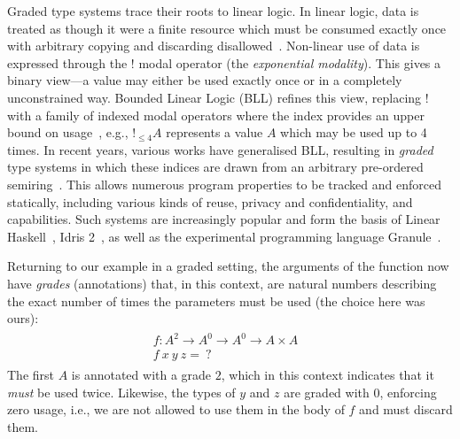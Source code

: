 Graded type systems trace their roots to linear logic. In linear logic, data is
treated as though it were a finite resource which must be consumed exactly once
with arbitrary copying and discarding disallowed~\citep{girard1987linear}.
Non-linear use of data is expressed through the $!$ modal operator (the
\emph{exponential modality}). This gives a binary view---a value may either be
used exactly once or in a completely unconstrained way. Bounded Linear Logic
(BLL) refines this view, replacing ! with a family of indexed modal operators
where the index provides an upper bound on usage~\citep{girard1992bounded},
e.g., $!_{\leq 4}A$ represents a value $A$ which may be used up to 4 times. In
recent years, various works have generalised BLL, resulting in \textit{graded}
type systems in which these indices are drawn from an arbitrary pre-ordered
semiring~\citep{DBLP:conf/esop/BrunelGMZ14,DBLP:conf/esop/GhicaS14,petricek2014coeffects,DBLP:journals/pacmpl/AbelB20,DBLP:journals/pacmpl/ChoudhuryEEW21,quantitative-type-theory,McBride2016}.
This allows numerous program properties to be tracked and enforced statically,
including various kinds of reuse, privacy and confidentiality, and capabilities.
Such systems are increasingly popular and form the basis of Linear
Haskell~\citep{DBLP:journals/pacmpl/BernardyBNJS18}, Idris
2~\citep{DBLP:journals/corr/abs-2104-00480}, as well as the experimental
programming language Granule~\citep{DBLP:journals/pacmpl/OrchardLE19}.

Returning to our example in a graded setting, the arguments of the function now
have \emph{grades} (annotations) that, in this context, are natural numbers
describing the exact number of times the parameters must be used (the choice
here was ours):
%
\begin{align*}
  \begin{array}{ll}
    f : A^{2} \rightarrow A^{0} \rightarrow A^{0} \rightarrow A \times A &
    \\
    f\ x\ y\ z =\ ? &
  \end{array}
\end{align*}
The first $A$ is annotated with a grade $2$, which in this context indicates that it
\textit{must} be used twice. Likewise, the types of $y$ and $z$
are graded with $0$, enforcing zero usage, i.e., we are not allowed
to use them in the body of $f$ and must discard them.

